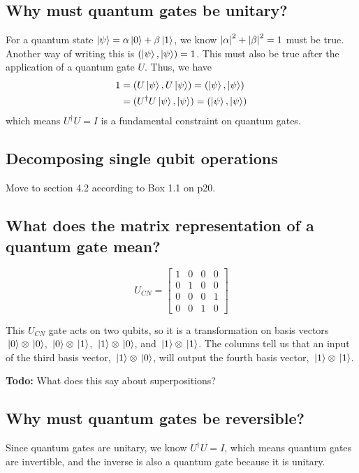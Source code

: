 \subsection{Why must quantum gates be unitary?}

For a quantum state $\ket{\psi} = \alpha \ket{0} + \beta \ket{1}$, we know $\abs{\alpha}^{2} + \abs{\beta}^{2} = 1$ must be true. Another way of writing this is $(\ket{\psi}, \ket{\psi}) = 1$. This must also be true after the application of a quantum gate $U$. Thus, we have 
$$
\begin{aligned}
1 &= (U \ket{\psi}, U \ket{\psi}) = (\ket{\psi}, \ket{\psi}) \\
&= (U^{\dagger} U \ket{\psi}, \ket{\psi}) = (\ket{\psi}, \ket{\psi})
\end{aligned}
$$
which means $U^{\dagger}U = I$ is a fundamental constraint on quantum gates. 

\subsection{Decomposing single qubit operations}

Move to section 4.2 according to Box 1.1 on p20. 

\subsection{What does the matrix representation of a quantum gate mean?}

$$U_{CN} = \begin{bmatrix}
1 & 0 & 0 & 0 \\
0 & 1 & 0 & 0 \\
0 & 0 & 0 & 1 \\
0 & 0 & 1 & 0
\end{bmatrix}$$

This $U_{CN}$ gate acts on two qubits, so it is a transformation on basis vectors $\ket*{0} \otimes \ket*{0}$, $\ket*{0} \otimes \ket*{1}$, $\ket*{1} \otimes \ket*{0}$, and $\ket*{1} \otimes \ket*{1}$. The columns tell us that an input of the third basis vector, $\ket*{1} \otimes \ket*{0}$, will output the fourth basis vector, $\ket*{1} \otimes \ket*{1}$. 

\textbf{Todo:} What does this say about superpositions?

\subsection{Why must quantum gates be reversible?}
Since quantum gates are unitary, we know $U^{\dagger} U = I$, which means quantum gates are invertible, and the inverse is also a quantum gate because it is unitary. 


